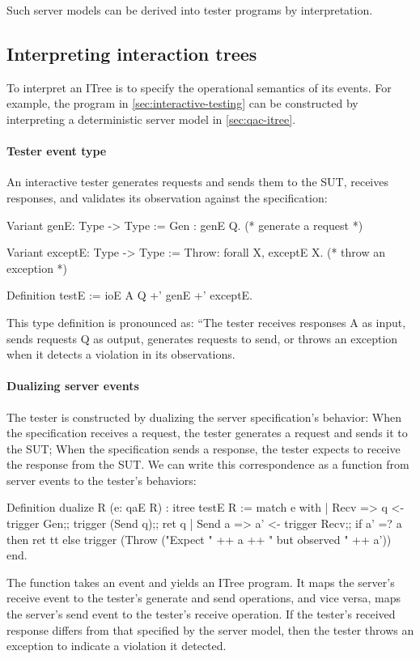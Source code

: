 Such server models can be derived into tester programs by interpretation.

\subsection{Interpreting interaction trees}
\label{sec:interp}
To interpret an ITree is to specify the operational semantics of its events.
For example, the  program in \autoref{sec:interactive-testing} can
be constructed by interpreting a deterministic server model in
\autoref{sec:qac-itree}.

\paragraph{Tester event type}
An interactive tester generates requests and sends them to the SUT, receives
responses, and validates its observation against the specification:
\begin{coq}
  Variant genE: Type -> Type :=
    Gen : genE Q.          (* generate a request *)

  Variant exceptE: Type -> Type :=
    Throw: forall X, exceptE X. (* throw an exception *)

  Definition testE := ioE A Q +' genE +' exceptE.
\end{coq}
This type definition is pronounced as: ``The tester receives responses \ilc A as
input, sends requests \ilc Q as output, generates requests to send, or throws an
exception when it detects a violation in its observations.

\paragraph{Dualizing server events}
The tester is constructed by dualizing the server specification's behavior: When
the specification receives a request, the tester generates a request and sends
it to the SUT; When the specification sends a response, the tester expects to
receive the response from the SUT.  We can write this correspondence as a
function from server events to the tester's behaviors:
\begin{coq}
  Definition dualize {R} (e: qaE R) : itree testE R :=
    match e with
    | Recv   => q <- trigger Gen;;
                trigger (Send q);;
                ret q
    | Send a => a' <- trigger Recv;;
                if a' =? a
                then ret tt
                else trigger (Throw ("Expect " ++ a ++ " but observed " ++ a'))
    end.
\end{coq}
The  function takes an event and yields an ITree program.  It maps
the server's receive event to the tester's generate and send operations, and
vice versa, maps the server's send event to the tester's receive operation.  If
the tester's received response differs from that specified by the server model,
then the tester throws an exception to indicate a violation it detected.

